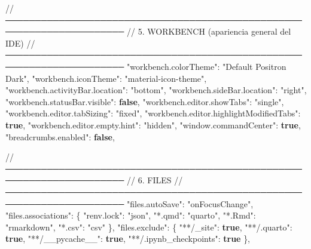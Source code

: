 \documentclass[
  doc,
  floatsintext,
  longtable,
  a4paper,
  nolmodern,
  notxfonts,
  notimes,
  12pt,
  colorlinks=true,linkcolor=blue,citecolor=blue,urlcolor=blue]{apa7}
\newenvironment{Shaded}{\begin{snugshade}}{\end{snugshade}}
\newcommand{\DataTypeTok}[1]{\textcolor[rgb]{0.68,0.00,0.00}{#1}}
\newcommand{\ErrorTok}[1]{\textcolor[rgb]{0.68,0.00,0.00}{#1}}
\newcommand{\FunctionTok}[1]{\textcolor[rgb]{0.28,0.35,0.67}{#1}}
\newcommand{\KeywordTok}[1]{\textcolor[rgb]{0.00,0.23,0.31}{\textbf{#1}}}
\newcommand{\StringTok}[1]{\textcolor[rgb]{0.13,0.47,0.30}{#1}}
\begin{document}
\begin{Shaded}
\begin{Highlighting}[]
  \ErrorTok{//} \ErrorTok{──────────────────────────────────────────────────────────────────────}
  \ErrorTok{//} \ErrorTok{5.} \ErrorTok{WORKBENCH} \ErrorTok{(apariencia} \ErrorTok{general} \ErrorTok{del} \ErrorTok{IDE)}
  \ErrorTok{//} \ErrorTok{──────────────────────────────────────────────────────────────────────}
  \DataTypeTok{"workbench.colorTheme"}\FunctionTok{:} \StringTok{"Default Positron Dark"}\FunctionTok{,}
  \DataTypeTok{"workbench.iconTheme"}\FunctionTok{:} \StringTok{"material{-}icon{-}theme"}\FunctionTok{,}
  \DataTypeTok{"workbench.activityBar.location"}\FunctionTok{:} \StringTok{"bottom"}\FunctionTok{,}
  \DataTypeTok{"workbench.sideBar.location"}\FunctionTok{:} \StringTok{"right"}\FunctionTok{,}
  \DataTypeTok{"workbench.statusBar.visible"}\FunctionTok{:} \KeywordTok{false}\FunctionTok{,}
  \DataTypeTok{"workbench.editor.showTabs"}\FunctionTok{:} \StringTok{"single"}\FunctionTok{,}
  \DataTypeTok{"workbench.editor.tabSizing"}\FunctionTok{:} \StringTok{"fixed"}\FunctionTok{,}
  \DataTypeTok{"workbench.editor.highlightModifiedTabs"}\FunctionTok{:} \KeywordTok{true}\FunctionTok{,}
  \DataTypeTok{"workbench.editor.empty.hint"}\FunctionTok{:} \StringTok{"hidden"}\FunctionTok{,}
  \DataTypeTok{"window.commandCenter"}\FunctionTok{:} \KeywordTok{true}\FunctionTok{,}
  \DataTypeTok{"breadcrumbs.enabled"}\FunctionTok{:} \KeywordTok{false}\FunctionTok{,}

  \ErrorTok{//} \ErrorTok{──────────────────────────────────────────────────────────────────────}
  \ErrorTok{//} \ErrorTok{6.} \ErrorTok{FILES}
  \ErrorTok{//} \ErrorTok{──────────────────────────────────────────────────────────────────────}
  \DataTypeTok{"files.autoSave"}\FunctionTok{:} \StringTok{"onFocusChange"}\FunctionTok{,}
  \DataTypeTok{"files.associations"}\FunctionTok{:} \FunctionTok{\{}
    \DataTypeTok{"renv.lock"}\FunctionTok{:} \StringTok{"json"}\FunctionTok{,}
    \DataTypeTok{"*.qmd"}\FunctionTok{:} \StringTok{"quarto"}\FunctionTok{,}
    \DataTypeTok{"*.Rmd"}\FunctionTok{:} \StringTok{"rmarkdown"}\FunctionTok{,}
    \DataTypeTok{"*.csv"}\FunctionTok{:} \StringTok{"csv"}
  \FunctionTok{\},}
  \DataTypeTok{"files.exclude"}\FunctionTok{:} \FunctionTok{\{}
    \DataTypeTok{"**/\_site"}\FunctionTok{:} \KeywordTok{true}\FunctionTok{,}
    \DataTypeTok{"**/.quarto"}\FunctionTok{:} \KeywordTok{true}\FunctionTok{,}
    \DataTypeTok{"**/\_\_pycache\_\_"}\FunctionTok{:} \KeywordTok{true}\FunctionTok{,}
    \DataTypeTok{"**/.ipynb\_checkpoints"}\FunctionTok{:} \KeywordTok{true}
  \FunctionTok{\},}


\end{Highlighting}
\end{Shaded}
\end{document}
